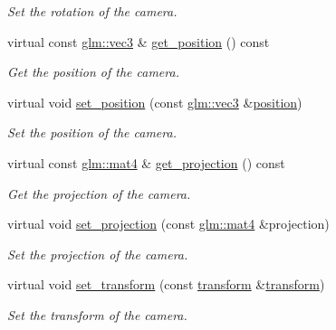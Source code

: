 \begin{DoxyCompactItemize}
\begin{DoxyCompactList}\small\item\em Set the rotation of the camera. \end{DoxyCompactList}\item 
virtual const \mbox{\hyperlink{namespacemoka_aed2224bc0e5b79e57a8975ded94ee1aaa97ade28e93c0de60adc075bdbe07ca36}{glm\+::vec3}} \& \mbox{\hyperlink{classmoka_1_1basic__camera_afa49b769555a670396d178141376902e}{get\+\_\+position}} () const
\begin{DoxyCompactList}\small\item\em Get the position of the camera. \end{DoxyCompactList}\item 
virtual void \mbox{\hyperlink{classmoka_1_1basic__camera_a48528f88bf5b5e06d4cab6f93183a62a}{set\+\_\+position}} (const \mbox{\hyperlink{namespacemoka_aed2224bc0e5b79e57a8975ded94ee1aaa97ade28e93c0de60adc075bdbe07ca36}{glm\+::vec3}} \&\mbox{\hyperlink{namespacemoka_a16a7bd7fc66f698dfcaf9bca1312a2bba4757fe07fd492a8be0ea6a760d683d6e}{position}})
\begin{DoxyCompactList}\small\item\em Set the position of the camera. \end{DoxyCompactList}\item 
virtual const \mbox{\hyperlink{namespacemoka_aed2224bc0e5b79e57a8975ded94ee1aaabe14b41eb96410ea28b32bc138d885ae}{glm\+::mat4}} \& \mbox{\hyperlink{classmoka_1_1basic__camera_a444f348fa7557b80052fa2c2471cd1f8}{get\+\_\+projection}} () const
\begin{DoxyCompactList}\small\item\em Get the projection of the camera. \end{DoxyCompactList}\item 
virtual void \mbox{\hyperlink{classmoka_1_1basic__camera_ac0cef3f49a34e3b63c6a58c8843768cd}{set\+\_\+projection}} (const \mbox{\hyperlink{namespacemoka_aed2224bc0e5b79e57a8975ded94ee1aaabe14b41eb96410ea28b32bc138d885ae}{glm\+::mat4}} \&projection)
\begin{DoxyCompactList}\small\item\em Set the projection of the camera. \end{DoxyCompactList}\item 
virtual void \mbox{\hyperlink{classmoka_1_1basic__camera_af33dd8db22f7da889a70507ae188fc24}{set\+\_\+transform}} (const \mbox{\hyperlink{classmoka_1_1transform}{transform}} \&\mbox{\hyperlink{classmoka_1_1transform}{transform}})
\begin{DoxyCompactList}\small\item\em Set the transform of the camera. \end{DoxyCompactList}\item 

\end{DoxyCompactItemize}
